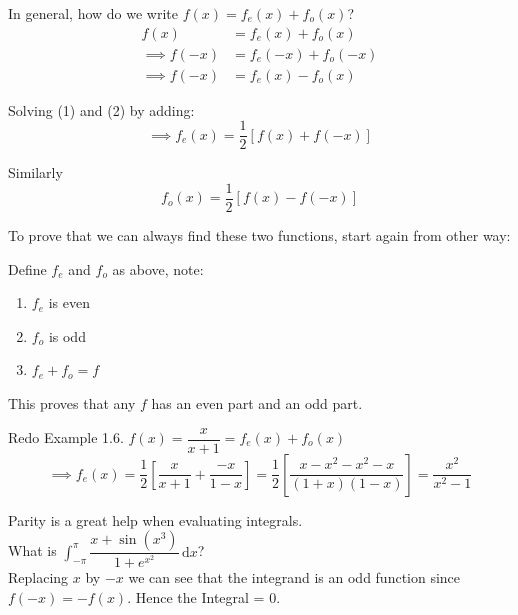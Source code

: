 \documentclass[10pt]{scrartcl}
\begin{document}
In general, how do we write $f(x) = f_e(x) + f_o(x)$?
\begin{align*}
f(x) &= f_e(x) + f_o(x) \tag{1}\\ 
\implies f(-x) &= f_e(-x) + f_o(-x) \\
\implies f(-x) &= f_e(x) - f_o(x) \tag{2}
\end{align*}

Solving (1) and (2) by adding: 
\[\implies f_e(x) = \frac{1}{2} [f(x) + f(-x)]\]

Similarly \[f_o(x) = \frac{1}{2} [f(x) - f(-x)]\]

To prove that we can always find these two functions, start again from other way:

Define $f_e$ and $f_o$ as above, note: 
\begin{enumerate}
\item $f_e$ is even
\item $f_o$ is odd
\item $f_e + f_o = f$
\end{enumerate}

This proves that any $f$ has an even part and an odd part.\\

\begin{example}
Redo Example 1.6. $f(x) = \dfrac{x}{x+1} = f_e(x) + f_o(x)$
\[\implies f_e(x) = \frac{1}{2} \left[\dfrac{x}{x+1} + \dfrac{-x}{1-x}\right] = \frac{1}{2} \left[\dfrac{x - x^2 - x^2 -x}{(1+x)(1-x)}\right] = \dfrac{x^2}{x^2-1}\]
\end{example}

Parity is a great help when evaluating integrals.\\

What is $\displaystyle{ \int_{-\pi}^{\pi} \dfrac{x + \sin (x^3)}{1 + e^{x^2}} \, \mathrm{d}x}$?\\

Replacing $x$ by $-x$ we can see that the integrand is an odd function since $f(-x) = -f(x)$. Hence the Integral = 0.


  \begin{center}
\end{center}\vspace*{5pt}
\end{document}
